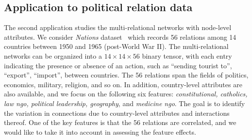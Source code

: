 \documentclass[12pt]{article}
\theoremstyle{definition}
\theoremstyle{definition}
\begin{document}
\subsection{Application to political relation data}

The second application studies the multi-relational networks with node-level attributes. We consider \emph{Nations} dataset~\citep{nickel2011three} which records 56 relations among 14 countries between 1950 and 1965 (post-World War II). The multi-relational networks can be organized into a $14 \times 14 \times 56$ binary tensor, with each entry indicating the presence or absence of an action, such as ``sending tourist to'', ``export'', ``import'', between countries. The 56 relations span the fields of politics, economics, military, religion, and so on. In addition, country-level attributes are also available, and we focus on the following six features: \emph{constitutional, catholics, law ngo, political leadership, geography}, and \emph{medicine ngo}. The goal is to identify the variation in connections due to country-level attributes and interactions thereof. One of the key features is that the 56 relations are correlated, and we would like to take it into account in assessing the feature effects. 
\end{document}
